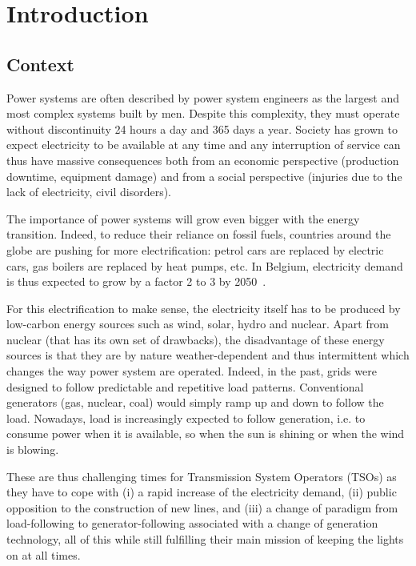 \chapter{Introduction}

\section{Context}

Power systems are often described by power system engineers as the largest and most complex systems built by men. Despite this complexity, they must operate without discontinuity 24 hours a day and 365 days a year. Society has grown to expect electricity to be available at any time and any interruption of service can thus have massive consequences both from an economic perspective (production downtime, equipment damage) and from a social perspective (injuries due to the lack of electricity, civil disorders).

The importance of power systems will grow even bigger with the energy transition. Indeed, to reduce their reliance on fossil fuels, countries around the globe are pushing for more electrification: petrol cars are replaced by electric cars, gas boilers are replaced by heat pumps, etc. In Belgium, electricity demand is thus expected to grow by a factor 2 to 3 by 2050~\cite{ref}.

For this electrification to make sense, the electricity itself has to be produced by low-carbon energy sources such as wind, solar, hydro and nuclear. Apart from nuclear (that has its own set of drawbacks), the disadvantage of these energy sources is that they are by nature weather-dependent and thus intermittent which changes the way power system are operated. Indeed, in the past, grids were designed to follow predictable and repetitive load patterns. Conventional generators (gas, nuclear, coal) would simply ramp up and down to follow the load. Nowadays, load is increasingly expected to follow generation, i.e. to consume power when it is available, so when the sun is shining or when the wind is blowing.

These are thus challenging times for Transmission System Operators (TSOs) as they have to cope with (i) a rapid increase of the electricity demand, (ii) public opposition to the construction of new lines, and (iii) a change of paradigm from load-following to generator-following associated with a change of generation technology, all of this while still fulfilling their main mission of keeping the lights on at all times.


